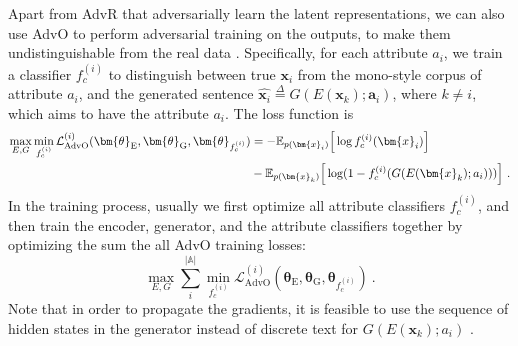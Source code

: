 Apart from AdvR that adversarially learn the latent representations, we can also use AdvO to perform adversarial training on the outputs, to make them undistinguishable from the real data . Specifically, for each attribute $a_i$, we train a classifier $f_c^{(i)}$ to distinguish between true $\bm{x}_i$ from the mono-style corpus of attribute $a_i$, and the generated sentence $\widehat{\bm{x}_i} \overset{\Delta}{=} G(E(\bm{x}_k); \bm{a}_i)$, where $k \neq i$, which aims to have the attribute $a_i$. The loss function is
\begin{equation}
\begin{split}
    \max_{E,G} \min_{f_c^{(i)}} \mathcal{L}_{\mathrm{AdvO}}^{(i)}(\bm{\theta}_{\mathrm{E}},\bm{\theta}_{\mathrm{G}},\bm{\theta}_{f_c^{(i)}}) 
    & = -\mathbb{E}_{p(\bm{x}_i)}\Big{[}\log f_c^{(i)}(\bm{x}_i)\Big{]} \\
    & - \mathbb{E}_{p(\bm{x}_k)}\Big{[}\log(1-f_c^{(i)}(G(E(\bm{x}_k); a_i)))\Big{]}
    ~.
\end{split}
\label{equation:cross-alignment-auto-encoder}
\end{equation}
In the training process, usually we first optimize all attribute classifiers $f_c^{(i)}$, and then train the encoder, generator, and the attribute classifiers together by optimizing the sum the all AdvO training losses:
\begin{equation}
    \max_{E,G} \sum_i^{|\mathbb{A}|} \min_{f_c^{(i)}} \mathcal{L}_{\mathrm{AdvO}}^{(i)}(\bm{\theta}_{\mathrm{E}},\bm{\theta}_{\mathrm{G}},\bm{\theta}_{f_c^{(i)}})~.
\end{equation}
Note that in order to propagate the gradients, it is feasible to use the sequence of hidden states in the generator instead of discrete text for $G(E(\bm{x}_k); a_i)$ .

